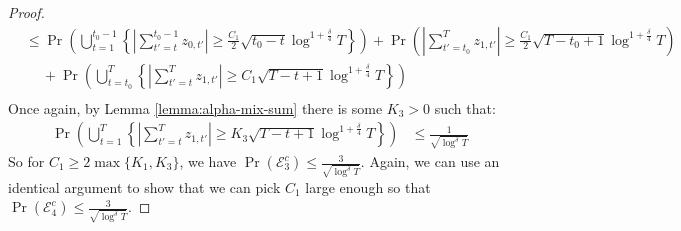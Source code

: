 \begin{proof}
\begin{align*}
     &\leq \Pr\left(\bigcup_{t=1}^{t_0-1} \left\{\left|\sum_{t'=t}^{t_0-1} z_{0,t'}\right| \geq \frac{C_1}{2}\sqrt{t_0-t}\log^{1+\frac{\delta}{4}} T\right\}  \right) + \Pr\left( \left|\sum_{t'=t_0}^{T} z_{1,t'}\right| \geq \frac{C_1}{2}\sqrt{T-t_0+1}\log^{1+\frac{\delta}{4}} T  \right) \\
     &\quad\: + \Pr\left(\bigcup_{t=t_0}^{T} \left\{\left|\sum_{t'=t}^{T} z_{1,t'}\right| \geq C_1\sqrt{T-t+1}\log^{1+\frac{\delta}{4}} T\right\} \right) \tag{union bound} \\
\end{align*}
\normalsize
Once again, by Lemma \ref{lemma:alpha-mix-sum} there is some $K_3 > 0$ such that:
\begin{align*}
    \Pr\left(\bigcup_{t=1}^{T} \left\{\left|\sum_{t'=t}^{T} z_{1,t'}\right| \geq K_3\sqrt{T-t+1}\log^{1+\frac{\delta}{4}} T\right\} \right)  &\leq \frac{1}{\sqrt{\log^\delta T}}
\end{align*}
So for $C_1 \geq 2\max\{K_1,K_3\}$, we have $\Pr\left(\mathcal{E}_3^c\right) \leq \frac{3}{\sqrt{\log^\delta T}}$. Again, we can use an identical argument to show that we can pick $C_1$ large enough so that $\Pr\left(\mathcal{E}_4^c\right) \leq \frac{3}{\sqrt{\log^\delta T}}$.

\end{proof}
